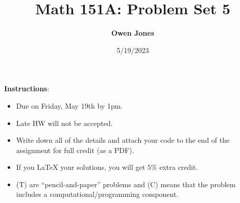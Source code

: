 \documentclass[12pt]{article}
\title{\bf Math 151A: Problem Set 5}
\date{ 5/19/2023}
\author{\bf Owen Jones}
\begin{document}
\maketitle


{\small \textbf{Instructions}:
\begin{itemize}
\item Due on Friday, May 19th by 1pm.
\item Late HW will not be accepted.
\item Write down all of the details and attach your code to the end of the assignment for full credit (as a PDF).  
\item If you LaTeX your solutions, you will get $5\%$ extra credit. 
\item (T) are ``pencil-and-paper'' problems and (C) means that the problem includes a computational/programming component. 
\end{itemize}}

\vspace{1em}
\end{document}

